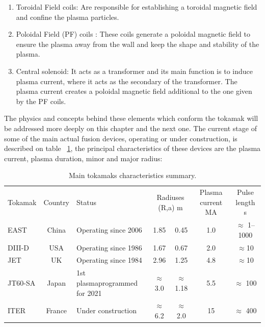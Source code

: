 \begin{enumerate}
	\item Toroidal Field coils: Are responsible for establishing a toroidal magnetic field  and confine the plasma particles.
	\smallskip
	
	\item Poloidal Field (PF) coils : These coils generate a poloidal magnetic field  to ensure the plasma away from the wall and keep the shape and stability of the plasma.\smallskip
	
	\item Central solenoid: It acts as a transformer and its main function is to induce plasma current, where it acts as the secondary of the transformer. The plasma current creates a poloidal magnetic field additional to the one given by the PF coils. \smallskip
	
\end{enumerate}

The physics and concepts behind these elements which conform the tokamak will be addressed more deeply on this chapter and the next one. The current stage of some of the main actual fusion devices, operating or under construction,  is described on table ~\ref{Tokamak_table}, the principal characteristics of these devices are the plasma current, plasma duration, minor and major radius:



\begin{table}[]
	\centering
	\begin{tabular}{|l|c|p{25mm}|c|c|c|c|}
		\hline
		\rowcolor{color2}
		\multicolumn{7}{|c|}{\textbf{Tokamak }}                                                                 \\ \hline
		\rowcolor{color1}
		Tokamak  & Country               & Status & \multicolumn{2}{c|}{Radiuses (R,a) m}   & Plasma current MA    & Pulse length s          \\ \hline
		EAST                  & China               & Operating  since 2006              &  1.85& 0.45 & 	1.0  &  $\approx$ 1–1000\\ \hline
		DIII-D                  & USA               & Operating since 1986                      & 	1.67 & 0.67 &  2.0  & $\approx$10 \\ \hline

JET                 & UK               & Operating since 1984                & 2.96  & 1.25 & 4.8 & $\approx$10 \\ \hline
JT60-SA                  & Japan              & 1st plasma\newline programmed for 2021                & $\approx$ 3.0 & $\approx$ 1.18 & 5.5  & $\approx$ 100 \\ \hline
ITER                  & France               & Under construction                & $\approx$ 6.2 & $\approx$ 2.0 & 15 & $\approx$ 400  \\ \hline
	\end{tabular}
	\caption{ Main tokamaks characteristics summary.}
	\label{Tokamak_table}
\end{table}


